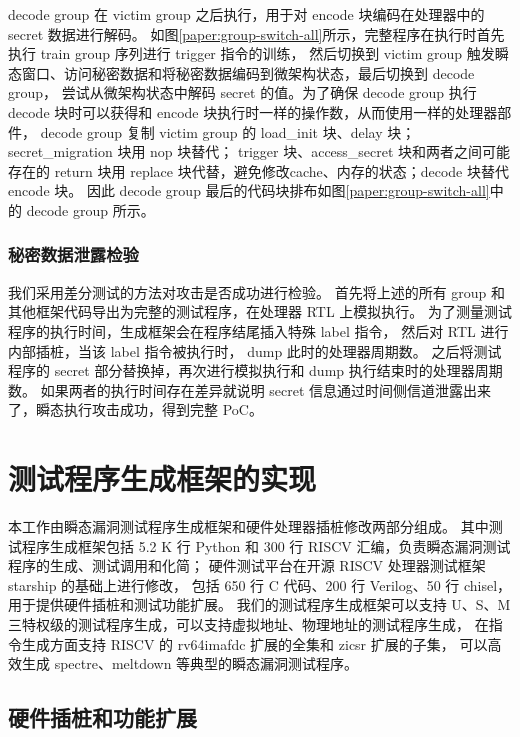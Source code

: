 decode group 在 victim group 之后执行，用于对 encode 块编码在处理器中的 secret 数据进行解码。
如图\ref{paper:group-switch-all}所示，完整程序在执行时首先执行 train group 序列进行 trigger 指令的训练，
然后切换到 victim group 触发瞬态窗口、访问秘密数据和将秘密数据编码到微架构状态，最后切换到 decode group，
尝试从微架构状态中解码 secret 的值。为了确保 decode group 执行 decode 块时可以获得和 encode 块执行时一样的操作数，从而使用一样的处理器部件，
decode group 复制 victim group 的 load\_init 块、delay 块；secret\_migration 块用 nop 块替代；
trigger 块、access\_secret 块和两者之间可能存在的 return 块用 replace 块代替，避免修改cache、内存的状态；decode 块替代 encode 块。
因此 decode group 最后的代码块排布如图\ref{paper:group-switch-all}中的 decode group 所示。\par

\subsubsection{秘密数据泄露检验}

我们采用差分测试的方法对攻击是否成功进行检验。
首先将上述的所有 group 和其他框架代码导出为完整的测试程序，在处理器 RTL 上模拟执行。
为了测量测试程序的执行时间，生成框架会在程序结尾插入特殊 label 指令，
然后对 RTL 进行内部插桩，当该 label 指令被执行时， dump 此时的处理器周期数。
之后将测试程序的 secret 部分替换掉，再次进行模拟执行和 dump 执行结束时的处理器周期数。
如果两者的执行时间存在差异就说明 secret 信息通过时间侧信道泄露出来了，瞬态执行攻击成功，得到完整 PoC。

\cleardoublepage
\section{测试程序生成框架的实现}

本工作由瞬态漏洞测试程序生成框架和硬件处理器插桩修改两部分组成。
其中测试程序生成框架包括 5.2 K 行 Python 和 300 行 RISCV 汇编，负责瞬态漏洞测试程序的生成、测试调用和化简；
硬件测试平台在开源 RISCV 处理器测试框架 starship\cite{starship} 的基础上进行修改，
包括 650 行 C 代码、200 行 Verilog、50 行 chisel，用于提供硬件插桩和测试功能扩展。
我们的测试程序生成框架可以支持 U、S、M 三特权级的测试程序生成，可以支持虚拟地址、物理地址的测试程序生成，
在指令生成方面支持 RISCV 的 rv64imafdc 扩展的全集和 zicsr 扩展的子集，
可以高效生成 spectre、meltdown 等典型的瞬态漏洞测试程序。\par

\subsection{硬件插桩和功能扩展}

